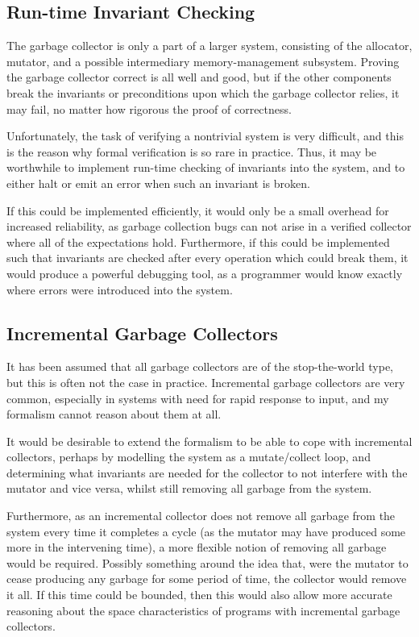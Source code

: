 \subsection{Run-time Invariant Checking}
\label{sec:conclusion-further-invariants}

The garbage collector is only a part of a larger system, consisting of
the allocator, mutator, and a possible intermediary memory-management
subsystem. Proving the garbage collector correct is all well and good,
but if the other components break the invariants or preconditions upon
which the garbage collector relies, it may fail, no matter how
rigorous the proof of correctness.

Unfortunately, the task of verifying a nontrivial system is very
difficult, and this is the reason why formal verification is so rare
in practice. Thus, it may be worthwhile to implement run-time checking
of invariants into the system, and to either halt or emit an error
when such an invariant is broken.

If this could be implemented efficiently, it would only be a small
overhead for increased reliability, as garbage collection bugs can not
arise in a verified collector where all of the expectations
hold. Furthermore, if this could be implemented such that invariants
are checked after every operation which could break them, it would
produce a powerful debugging tool, as a programmer would know exactly
where errors were introduced into the system.

\subsection{Incremental Garbage Collectors}
\label{sec:conclusion-further-incremental}

It has been assumed that all garbage collectors are of the
stop-the-world type, but this is often not the case in
practice. Incremental garbage collectors are very common, especially
in systems with need for rapid response to input, and my formalism
cannot reason about them at all.

It would be desirable to extend the formalism to be able to cope with
incremental collectors, perhaps by modelling the system as a
mutate/collect loop, and determining what invariants are needed for
the collector to not interfere with the mutator and vice versa, whilst
still removing all garbage from the system.

Furthermore, as an incremental collector does not remove all garbage
from the system every time it completes a cycle (as the mutator may
have produced some more in the intervening time), a more flexible
notion of removing all garbage would be required. Possibly something
around the idea that, were the mutator to cease producing any garbage
for some period of time, the collector would remove it all. If this
time could be bounded, then this would also allow more accurate
reasoning about the space characteristics of programs with incremental
garbage collectors.

